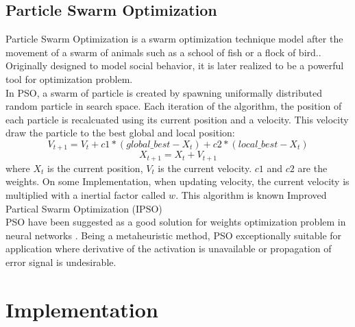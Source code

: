 \documentclass[13pt]{article}
\begin{document}
\subsection{Particle Swarm Optimization}
Particle Swarm Optimization is a swarm optimization technique model after the movement of a swarm of animals such as a school of fish or a flock of bird.\cite{eberhart_new_1995}. Originally designed to model social behavior, it is later realized to be a powerful tool for optimization problem.\\
In PSO, a swarm of particle is created by spawning uniformally distributed random particle in search space. Each iteration of the algorithm, the position of each particle is recalcuated using its current position and a velocity. This velocity draw the particle to the best global and local position:
\begin{equation}
    V_{t+1} = V_t + c1*(global\_best - X_t) + c2*(local\_best - X_t)
\end{equation}
\begin{equation}
    X_{t+1} = X_{t} + V_{t+1}
\end{equation}
where $X_t$ is the current position, $V_t$ is the current velocity. $c1$ and $c2$ are the weights. On some Implementation, when updating velocity, the current velocity is multiplied with a inertial factor called $w$. This algorithm is known Improved Partical Swarm Optimization (IPSO) \cite{li_improved_2005}\\
PSO have been suggested as a good solution for weights optimization problem in neural networks\cite{hutchison_evolutionary_2006} \cite{zhu_evolutionary_2005}. Being a metaheuristic method, PSO exceptionally suitable for application where derivative of the activation is unavailable or propagation of error signal is undesirable.
\newpage
\section{Implementation}
\end{document}
